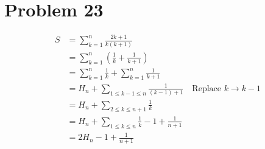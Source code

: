\section*{Problem 23}
\begin{align*}
    S & = \sum_{k=1}^{n} \frac{2k+1}{k(k+1)}                                                      \\
      & =\sum_{k=1}^{n} \left(\frac{1}{k} + \frac{1}{k+1}\right)                                  \\
      & = \sum_{k=1}^{n} \frac{1}{k} + \sum_{k=1}^{n} \frac{1}{k+1}                               \\
      & = H_n + \sum_{1\leq k-1 \leq n} \frac{1}{(k-1)+1} \quad \text{Replace $k\rightarrow k-1$} \\
      & = H_n + \sum_{2\leq k \leq n+1} \frac{1}{k}                                               \\
      & = H_n + \sum_{1\leq k \leq n} \frac{1}{k} - 1 + \frac{1}{n+1}                             \\
      & = 2H_n - 1 + \frac{1}{n+1}
\end{align*}
